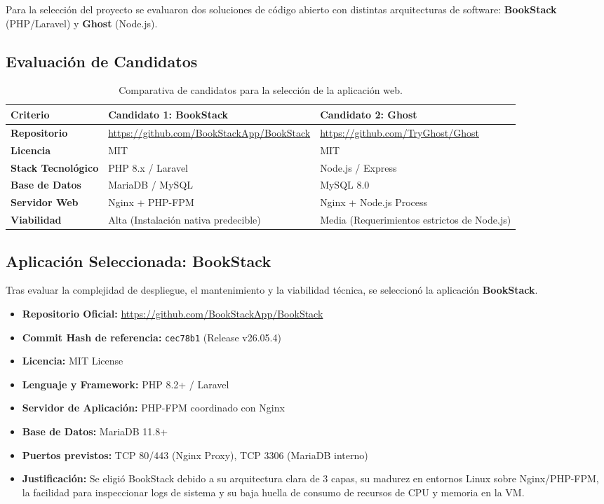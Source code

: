 \documentclass[12pt,a4paper]{article}
\begin{document}
Para la selección del proyecto se evaluaron dos soluciones de código abierto con distintas arquitecturas de software: \textbf{BookStack} (PHP/Laravel) y \textbf{Ghost} (Node.js).

\subsection{Evaluación de Candidatos}

\begin{table}[h!]
\centering
\small
\begin{tabular}{|p{3cm}|p{5.5cm}|p{5.5cm}|}
\hline
\textbf{Criterio} & \textbf{Candidato 1: BookStack} & \textbf{Candidato 2: Ghost} \\ \hline
\textbf{Repositorio} & \url{https://github.com/BookStackApp/BookStack} & \url{https://github.com/TryGhost/Ghost} \\ \hline
\textbf{Licencia} & MIT & MIT \\ \hline
\textbf{Stack Tecnológico} & PHP 8.x / Laravel & Node.js / Express \\ \hline
\textbf{Base de Datos} & MariaDB / MySQL & MySQL 8.0 \\ \hline
\textbf{Servidor Web} & Nginx + PHP-FPM & Nginx + Node.js Process \\ \hline
\textbf{Viabilidad} & Alta (Instalación nativa predecible) & Media (Requerimientos estrictos de Node.js) \\ \hline
\end{tabular}
\caption{Comparativa de candidatos para la selección de la aplicación web.}
\label{tab:candidatos}
\end{table}

\subsection{Aplicación Seleccionada: BookStack}
Tras evaluar la complejidad de despliegue, el mantenimiento y la viabilidad técnica, se seleccionó la aplicación \textbf{BookStack}.

\begin{itemize}
    \item \textbf{Repositorio Oficial:} \url{https://github.com/BookStackApp/BookStack}
    \item \textbf{Commit Hash de referencia:} \texttt{cec78b1} (Release v26.05.4)
    \item \textbf{Licencia:} MIT License
    \item \textbf{Lenguaje y Framework:} PHP 8.2+ / Laravel
    \item \textbf{Servidor de Aplicación:} PHP-FPM coordinado con Nginx
    \item \textbf{Base de Datos:} MariaDB 11.8+
    \item \textbf{Puertos previstos:} TCP 80/443 (Nginx Proxy), TCP 3306 (MariaDB interno)
    \item \textbf{Justificación:} Se eligió BookStack debido a su arquitectura clara de 3 capas, su madurez en entornos Linux sobre Nginx/PHP-FPM, la facilidad para inspeccionar logs de sistema y su baja huella de consumo de recursos de CPU y memoria en la VM.
\end{itemize}
\end{document}

